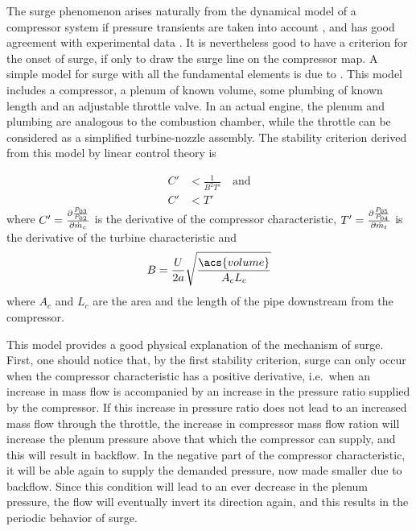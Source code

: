 \documentclass[tcc]{subfiles}
\begin{document}
The surge phenomenon arises naturally from the dynamical model of a compressor system if pressure transients are taken into account \cite{Greitzer1976}, 
and has good agreement with experimental data \cite{Greitzer1976_2,Gravdahl2004}.
It is nevertheless good to have a criterion for the onset of surge, if only to draw the surge line on the compressor map.
A simple model for surge with all the fundamental elements is due to \textcite{Fink1988}. This model includes a compressor, a plenum of known volume, some plumbing of known length and an adjustable throttle valve. 
In an actual engine, the plenum and plumbing are analogous to the combustion chamber, while the throttle can be considered as a simplified turbine-nozzle assembly. 
The stability criterion derived from this model by linear control theory is

\begin{align}
    C' &< \frac{1}{B^2 T'} \label{eqn:surge} \quad\text{and}\\
    C' &< T'
\end{align}
where $C' = \frac{\partial \frac{P_{03}}{P_{02}}}{\partial \dot{m}_c}$ is the derivative of the compressor characteristic, $T' = \frac{\partial \frac{P_{05}}{P_{04}}}{\partial \dot{m}_t}$ is the derivative of the turbine characteristic and 
\begin{equation}
    B = \frac{U}{2a}\sqrt{\frac{\acs{volume}}{A_c L_c}}
\end{equation}
where $A_c$ and $L_c$ are the area and the length of the pipe downstream from the compressor.

This model provides a good physical explanation of the mechanism of surge. 
First, one should notice that, by the first stability criterion, surge can only occur when the compressor characteristic has a positive derivative, 
i.e.\ when an increase in mass flow is accompanied by an increase in the pressure ratio supplied by the compressor. 
If this increase in pressure ratio does not lead to an increased mass flow through the throttle, the increase in compressor mass flow ration will increase the plenum pressure above that which the compressor can supply, and this will result in backflow. In the negative part of the compressor characteristic, it will be able again to supply the demanded pressure, now made smaller due to backflow. Since this condition will lead to an ever decrease in the plenum pressure, the flow will eventually invert its direction again, and this results in the periodic behavior of surge.
\end{document}
